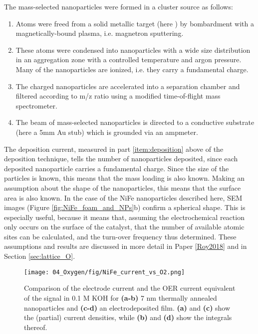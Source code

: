 The mass-selected nanoparticles were formed in a cluster source as follows\cite{VonIssendorff1999}: 
\begin{enumerate} 
	\item Atoms were freed from a solid metallic target (here ) by bombardment with a magnetically-bound plasma, i.e. magnetron sputtering. 
	
	\item These atoms were condensed into nanoparticles with a wide size distribution in an aggregation zone with a controlled temperature and argon pressure. Many of the nanoparticles are ionized, i.e. they carry a fundamental charge. 
	
	\item The charged nanoparticles are accelerated into a separation chamber and filtered according to m/z ratio using a modified time-of-flight mass spectrometer. 
	
	\item The beam of mass-selected nanoparticles is directed to a conductive substrate (here a 5mm Au stub) which is grounded via an ampmeter.  \label{item:deposition}
\end{enumerate}

The deposition current, measured in part \ref{item:deposition} above of the deposition technique, tells the number of nanoparticles deposited, since each deposited nanoparticle carries a fundamental charge. Since the size of the particles is known, this means that the mass loading is also known. Making an assumption about the shape of the nanoparticles, this means that the surface area is also known. In the case of the NiFe nanoparticles described here, SEM images (Figure \ref{fig:NiFe_foam_and_NPs}b) confirm a spherical shape. This is especially useful, because it means that, assuming the electrochemical reaction only occurs on the surface of the catalyst, that the number of available atomic sites can be calculated, and the turn-over frequency thus determined. These assumptions and results are discussed in more detail in Paper \ref{Roy2018} and in Section \ref{sec:lattice_O}.


\begin{figure}[h]
	\centering
	\texttt{[image: 04\_Oxygen/fig/NiFe\_current\_vs\_O2.png]}
	\caption{Comparison of the electrode current and the OER current equivalent of the  signal in 0.1 M KOH for \textbf{(a-b)} 7 nm thermally annealed  nanoparticles and \textbf{(c-d)} an electrodeposited  film. \textbf{(a)} and \textbf{(c)} show the (partial) current densities, while \textbf{(b)} and \textbf{(d)} show the integrals thereof.}
	\label{fig:NiFe_current_vs_O2}
\end{figure}

